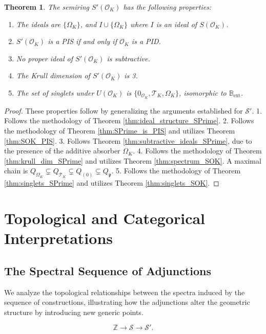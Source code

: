 \documentclass[11pt, a4paper]{article}
\theoremstyle{plain}
\newtheorem{theorem}{Theorem}[section]
\theoremstyle{definition}
\numberwithin{equation}{section}
\newcommand{\Z}{\mathbb{Z}}
\newcommand{\Tobj}{\mathcal{T}} %
\newcommand{\OmegaObj}{\Omega} %
\newcommand{\SemiringS}{\mathcal{S}}
\newcommand{\SemiringSPrime}{\mathcal{S}'}
\newcommand{\BoolExt}{\mathbb{B}_{\mathrm{ext}}} %
\newcommand{\OK}{\mathcal{O}_K}
\newcommand{\SOK}{S(\OK)}
\newcommand{\SPOK}{S'(\OK)}
\newcommand{\p}{\mathfrak{p}}
\begin{document}
\begin{theorem}\label{thm:properties_SpOK}
The semiring $\SPOK$ has the following properties:
\begin{enumerate}
    \item The ideals are $\{\OmegaObj_K\}$, and $I\cup\{\OmegaObj_K\}$ where $I$ is an ideal of $\SOK$.
    \item $\SPOK$ is a PIS if and only if $\OK$ is a PID.
    \item No proper ideal of $\SPOK$ is subtractive.
    \item The Krull dimension of $\SPOK$ is 3.
    \item The set of singlets under $U(\OK)$ is $\{0_{\OK}, \Tobj_K, \OmegaObj_K\}$, isomorphic to $\BoolExt$.
\end{enumerate}
\end{theorem}
\begin{proof}
These properties follow by generalizing the arguments established for $\SemiringSPrime$.
1. Follows the methodology of Theorem \ref{thm:ideal_structure_SPrime}.
2. Follows the methodology of Theorem \ref{thm:SPrime_is_PIS} and utilizes Theorem \ref{thm:SOK_PIS}.
3. Follows Theorem \ref{thm:subtractive_ideals_SPrime}, due to the presence of the additive absorber $\OmegaObj_K$.
4. Follows the methodology of Theorem \ref{thm:krull_dim_SPrime} and utilizes Theorem \ref{thm:spectrum_SOK}. A maximal chain is $Q_{\OmegaObj_K} \subsetneq Q_{\Tobj_K} \subsetneq Q_{(0)} \subsetneq Q_{\p}$.
5. Follows the methodology of Theorem \ref{thm:singlets_SPrime} and utilizes Theorem \ref{thm:singlets_SOK}.
\end{proof}

\section{Topological and Categorical Interpretations}

\subsection{The Spectral Sequence of Adjunctions}

We analyze the topological relationships between the spectra induced by the sequence of constructions, illustrating how the adjunctions alter the geometric structure by introducing new generic points.

\begin{equation}
    \Z \to \SemiringS \to \SemiringSPrime.
\end{equation}
\end{document}
